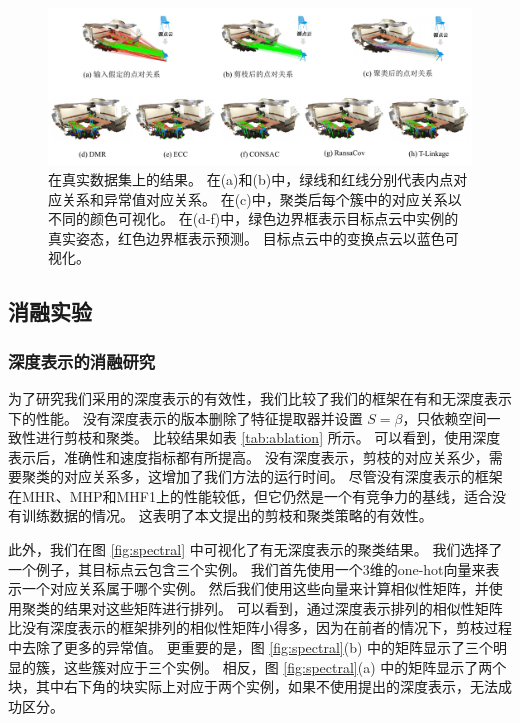 \begin{figure}
        \centering
        \includegraphics[width=1.0\textwidth]{images/DMR_real.pdf}
        \caption{
          在真实数据集上的结果。
          在(a)和(b)中，绿线和红线分别代表内点对应关系和异常值对应关系。
          在(c)中，聚类后每个簇中的对应关系以不同的颜色可视化。
          在(d-f)中，绿色边界框表示目标点云中实例的真实姿态，红色边界框表示预测。
          目标点云中的变换点云以蓝色可视化。
        }
        \label{fig:DMR_real}
\end{figure}
      
\subsection{消融实验}
\label{sec:ablation}
\subsubsection{深度表示的消融研究}为了研究我们采用的深度表示的有效性，我们比较了我们的框架在有和无深度表示下的性能。
没有深度表示的版本删除了特征提取器并设置 $S=\beta$，只依赖空间一致性进行剪枝和聚类。
比较结果如表 \ref{tab:ablation} 所示。
可以看到，使用深度表示后，准确性和速度指标都有所提高。
没有深度表示，剪枝的对应关系少，需要聚类的对应关系多，这增加了我们方法的运行时间。
尽管没有深度表示的框架在MHR、MHP和MHF1上的性能较低，但它仍然是一个有竞争力的基线，适合没有训练数据的情况。
这表明了本文提出的剪枝和聚类策略的有效性。

此外，我们在图 \ref{fig:spectral} 中可视化了有无深度表示的聚类结果。
我们选择了一个例子，其目标点云包含三个实例。
我们首先使用一个3维的one-hot向量来表示一个对应关系属于哪个实例。
然后我们使用这些向量来计算相似性矩阵，并使用聚类的结果对这些矩阵进行排列。
可以看到，通过深度表示排列的相似性矩阵比没有深度表示的框架排列的相似性矩阵小得多，因为在前者的情况下，剪枝过程中去除了更多的异常值。
更重要的是，图 \ref{fig:spectral}(b) 中的矩阵显示了三个明显的簇，这些簇对应于三个实例。
相反，图 \ref{fig:spectral}(a) 中的矩阵显示了两个块，其中右下角的块实际上对应于两个实例，如果不使用提出的深度表示，无法成功区分。

